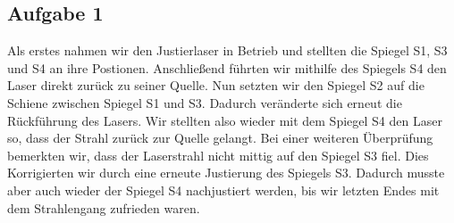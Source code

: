 \subsection{Aufgabe 1}

Als erstes nahmen wir den Justierlaser in Betrieb und stellten die Spiegel S1, S3 und S4 an ihre Postionen. Anschließend führten wir mithilfe des Spiegels S4 den Laser direkt zurück zu seiner Quelle. Nun setzten wir den Spiegel S2 auf die Schiene zwischen Spiegel S1 und S3. Dadurch veränderte sich erneut die Rückführung des Lasers. Wir stellten also wieder mit dem Spiegel S4 den Laser so, dass der Strahl zurück zur Quelle gelangt. Bei einer weiteren Überprüfung bemerkten wir, dass der Laserstrahl nicht mittig auf den Spiegel S3 fiel. Dies Korrigierten wir durch eine erneute Justierung des Spiegels S3. Dadurch musste aber auch wieder der Spiegel S4 nachjustiert werden, bis wir letzten Endes mit dem Strahlengang zufrieden waren.